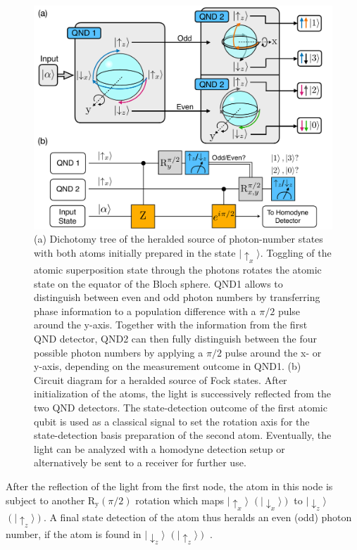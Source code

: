 \documentclass[prl,twocolumn,amsmath,amssymb,bibnotes,aps,longbibliography]{revtex4-1}
\newcommand{\ket}[1]{|{#1}\rangle}
\begin{document}
\begin{figure}[t]
\centering
\includegraphics[width=\columnwidth]{FigS2.pdf}
\caption{\label{fig:photonsorter} (a) Dichotomy tree of the heralded source of photon-number states with both atoms initially prepared in the state $\ket{\uparrow_x}$. Toggling of the atomic superposition state through the photons rotates the atomic state on the equator of the Bloch sphere. QND1 allows to distinguish between even and odd photon numbers by transferring phase information to a population difference with a $\pi/2$ pulse around the y-axis. Together with the information from the first QND detector, QND2 can then fully distinguish between the four possible photon numbers by applying a $\pi/2$ pulse around the x- or y-axis, depending on the measurement outcome in QND1. (b) Circuit diagram for a heralded source of Fock states. After initialization of the atoms, the light is successively reflected from the two QND detectors. The state-detection outcome of the first atomic qubit is used as a classical signal to set the rotation axis for the state-detection basis preparation of the second atom. Eventually, the light can be analyzed with a homodyne detection setup \cite{hacker2019supplement} or alternatively be sent to a receiver for further use.}
\end{figure}
After the reflection of the light from the first node, the atom in this node is subject to another $\text{R}_\text{y}(\pi/2)$ rotation which maps $\ket{\uparrow_x}$ $(\ket{\downarrow_x})$ to $\ket{\downarrow_z}$ $(\ket{\uparrow_z})$. A final state detection of the atom thus heralds an even (odd) photon number, if the atom is found in $\ket{\downarrow_z}$ $(\ket{\uparrow_z})$ \cite{hacker2019supplement}.
\end{document}
